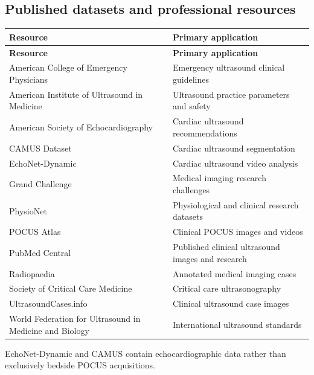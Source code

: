 \subsection{Published datasets and professional resources}
\begin{longtable}{@{}p{}p{}@{}}
\toprule
\textbf{Resource} & \textbf{Primary application} \\
\midrule
\endfirsthead
\toprule
\textbf{Resource} & \textbf{Primary application} \\
\midrule
\endhead
American College of Emergency Physicians & Emergency ultrasound clinical guidelines \\
American Institute of Ultrasound in Medicine & Ultrasound practice parameters and safety \\
American Society of Echocardiography & Cardiac ultrasound recommendations \\
CAMUS Dataset & Cardiac ultrasound segmentation \\
EchoNet-Dynamic & Cardiac ultrasound video analysis \\
Grand Challenge & Medical imaging research challenges \\
PhysioNet & Physiological and clinical research datasets \\
POCUS Atlas & Clinical POCUS images and videos \\
PubMed Central & Published clinical ultrasound images and research \\
Radiopaedia & Annotated medical imaging cases \\
Society of Critical Care Medicine & Critical care ultrasonography \\
UltrasoundCases.info & Clinical ultrasound case images \\
World Federation for Ultrasound in Medicine and Biology & International ultrasound standards \\
\bottomrule
\end{longtable}
EchoNet-Dynamic and CAMUS contain echocardiographic data rather than exclusively bedside POCUS acquisitions.

